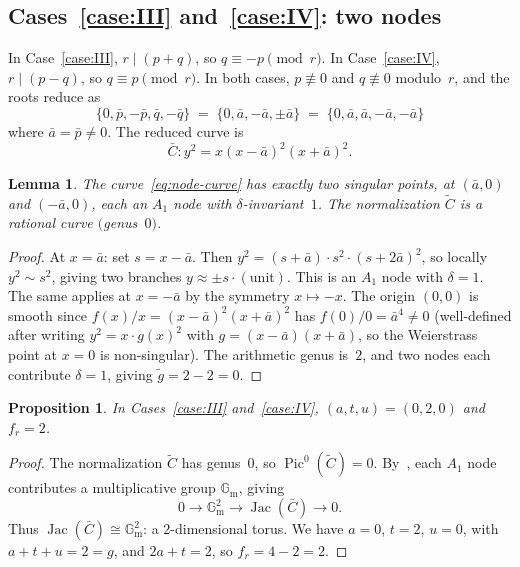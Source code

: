 \documentclass[11pt,a4paper]{article}
\newcommand{\Jac}{\operatorname{Jac}}
\newcommand{\Pic}{\operatorname{Pic}}
\newcommand{\Gm}{\mathbb{G}_{\mathrm{m}}}
\newtheorem{proposition}[theorem]{Proposition}
\newtheorem{lemma}[theorem]{Lemma}
\theoremstyle{definition}
\theoremstyle{remark}
\begin{document}
\subsection{Cases~\ref{case:III} and~\ref{case:IV}: two nodes}

In Case~\ref{case:III}, $r \mid (p + q)$, so
$q \equiv -p \pmod{r}$.
In Case~\ref{case:IV}, $r \mid (p - q)$, so
$q \equiv p \pmod{r}$.
In both cases, $p \not\equiv 0$ and $q \not\equiv 0$
modulo~$r$, and the roots reduce as
\[
  \{0, \bar{p}, -\bar{p}, \bar{q}, -\bar{q}\}
  \;=\;
  \{0, \bar{a}, -\bar{a}, \pm\bar{a}\}
  \;=\;
  \{0, \bar{a}, \bar{a}, -\bar{a}, -\bar{a}\}
\]
where $\bar{a} = \bar{p} \ne 0$.  The reduced curve is
\begin{equation}\label{eq:node-curve}
  \bar{C}\colon y^2 = x(x - \bar{a})^2(x + \bar{a})^2.
\end{equation}

\begin{lemma}\label{lem:nodes}
  The curve~\eqref{eq:node-curve} has exactly two singular
  points, at $(\bar{a}, 0)$ and $(-\bar{a}, 0)$, each an
  $A_1$ node with $\delta$-invariant~$1$.
  The normalization $\widetilde{C}$ is a rational curve
  $($genus~$0)$.
\end{lemma}

\begin{proof}
  At $x = \bar{a}$: set $s = x - \bar{a}$.  Then
  $y^2 = (s + \bar{a}) \cdot s^2 \cdot (s + 2\bar{a})^2$,
  so locally $y^2 \sim s^2$, giving two branches
  $y \approx \pm s \cdot (\text{unit})$.  This is an $A_1$
  node with $\delta = 1$.  The same applies at $x = -\bar{a}$
  by the symmetry $x \mapsto -x$.
  The origin $(0, 0)$ is smooth since $f(x)/x = (x - \bar{a})^2(x + \bar{a})^2$
  has $f(0)/0 = \bar{a}^4 \ne 0$ (well-defined after writing
  $y^2 = x \cdot g(x)^2$ with $g = (x - \bar{a})(x + \bar{a})$,
  so the Weierstrass point at $x = 0$ is non-singular).
  The arithmetic genus is~$2$, and two nodes each contribute
  $\delta = 1$, giving $\tilde{g} = 2 - 2 = 0$.
\end{proof}

\begin{proposition}\label{prop:node-neron}
  In Cases~\ref{case:III} and~\ref{case:IV},
  $(a, t, u) = (0, 2, 0)$ and $f_r = 2$.
\end{proposition}

\begin{proof}
  The normalization $\widetilde{C}$ has genus~$0$, so
  $\Pic^0(\widetilde{C}) = 0$.
  By~\cite{Serre1959}, each $A_1$ node contributes a
  multiplicative group $\Gm$, giving
  \[
    0 \longrightarrow \Gm^2 \longrightarrow
    \Jac(\bar{C}) \longrightarrow 0.
  \]
  Thus $\Jac(\bar{C}) \cong \Gm^2$: a $2$-dimensional torus.
  We have $a = 0$, $t = 2$, $u = 0$, with $a + t + u = 2 = g$,
  and $2a + t = 2$, so $f_r = 4 - 2 = 2$.
\end{proof}
\end{document}
